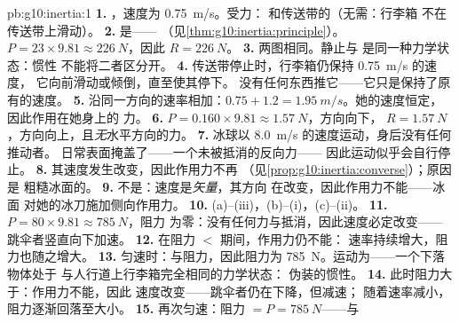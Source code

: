 \begin{solution}{pb:g10:inertia:1}
\textbf{1.} ，速度为 \qty{0.75}{m/s}。受力：
和传送带的（无需：行李箱
不在传送带上滑动）。
\textbf{2.} 是——
（见\cref{thm:g10:inertia:principle}）。$P = 23 \times 9.81 \approx
\qty{226}{N}$，因此 $R = \qty{226}{N}$。
\textbf{3.} 两图相同。静止与
是同一种力学状态：惯性
不能将二者区分开。
\textbf{4.} 传送带停止时，行李箱仍保持 \qty{0.75}{m/s} 的速度，
它向前滑动或倾倒，直至使其停下。
没有任何东西推它——它只是保持了原有的速度。
\textbf{5.} 沿同一方向的速率相加：$0.75 + 1.2 =
\qty{1.95}{m/s}$。她的速度恒定，因此作用在她身上的
力。
\textbf{6.} $P = 0.160 \times 9.81 \approx \qty{1.57}{N}$，方向向下，
$R = \qty{1.57}{N}$，方向向上，且\emph{无}水平方向的力。
\textbf{7.} 冰球以 \qty{8.0}{m/s} 的速度运动，身后没有任何推动者。
日常表面掩盖了——一个未被抵消的反向力——
因此运动似乎会自行停止。
\textbf{8.} 其速度发生改变，因此作用力不再
（见\cref{prop:g10:inertia:converse}）；原因是
粗糙冰面的。
\textbf{9.} 不是：速度是\emph{矢量}，其方向
在改变，因此作用力不能——冰面
对她的冰刀施加侧向作用力。
\textbf{10.} (a)--(iii)，(b)--(i)，(c)--(ii)。
\textbf{11.}  $P = 80 \times 9.81 \approx \qty{785}{N}$，阻力
为零：没有任何力与抵消，因此速度必定改变——
跳伞者竖直向下加速。
\textbf{12.} 在阻力 $<$ 期间，作用力仍不能：
速率持续增大，阻力也随之增大。
\textbf{13.} 匀速时：与阻力，因此阻力为
\qty{785}{N}。运动为——一个下落物体处于
与人行道上行李箱完全相同的力学状态：
伪装的惯性。
\textbf{14.} 此时阻力大于：作用力不能，因此
速度改变——跳伞者仍在下降，但减速；
随着速率减小，阻力逐渐回落至大小。
\textbf{15.} 再次匀速：阻力 $= P = \qty{785}{N}$——与

\end{solution}
